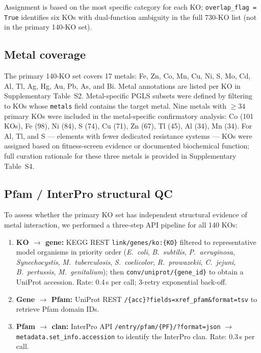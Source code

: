 \documentclass[11pt]{article}
\begin{document}
Assignment is based on the most specific category for each KO;
\texttt{overlap\_flag = True} identifies six KOs with dual-function ambiguity
in the full 730-KO list (not in the primary 140-KO set).

\subsection{Metal coverage}

The primary 140-KO set covers 17 metals: Fe, Zn, Co, Mn, Cu, Ni, S, Mo, Cd,
Al, Tl, Ag, Hg, Au, Pb, As, and Bi.  Metal annotations are listed per KO in
Supplementary Table~S2.  Metal-specific PGLS subsets were defined by filtering
to KOs whose \texttt{metals} field contains the target metal.  Nine metals with
$\geq 34$ primary KOs were included in the metal-specific confirmatory analysis:
Co (101 KOs), Fe (98), Ni (84), S (74), Cu (71), Zn (67), Tl (45), Al (34),
Mn (34). For Al, Tl, and S --- elements with fewer dedicated resistance systems --- KOs were assigned based on fitness-screen evidence or documented biochemical function; full curation rationale for these three metals is provided in Supplementary Table~S4.

\subsection{Pfam / InterPro structural QC}

To assess whether the primary KO set has independent structural evidence of
metal interaction, we performed a three-step API pipeline for all 140 KOs:

\begin{enumerate}
\item \textbf{KO $\to$ gene:} KEGG REST \texttt{link/genes/ko:\{KO\}} filtered
  to representative model organisms in priority order (\textit{E.\ coli},
  \textit{B.\ subtilis}, \textit{P.\ aeruginosa}, \textit{Synechocystis},
  \textit{M.\ tuberculosis}, \textit{S.\ coelicolor}, \textit{R.\ prowazekii},
  \textit{C.\ jejuni}, \textit{B.\ pertussis}, \textit{M.\ genitalium});
  then \texttt{conv/uniprot/\{gene\_id\}} to obtain a UniProt accession.
  Rate: 0.4\,s per call; 3-retry exponential back-off.

\item \textbf{Gene $\to$ Pfam:} UniProt REST
  \texttt{/\{acc\}?fields=xref\_pfam\&format=tsv} to retrieve Pfam domain IDs.

\item \textbf{Pfam $\to$ clan:} InterPro API
  \texttt{/entry/pfam/\{PF\}/?format=json} $\to$
  \texttt{metadata.set\_info.accession} to identify the InterPro clan.
  Rate: 0.3\,s per call.
\end{enumerate}
\end{document}
